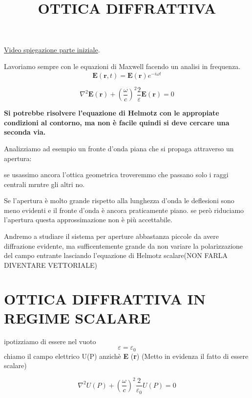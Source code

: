 \documentclass{article}
\begin{document}
\title{OTTICA DIFFRATTIVA}


\href{https://www.youtube.com/watch?v=8Ep_aPSrwYI}{Video spiegazione parte iniziale}.  %


Lavoriamo sempre con le equazioni di Maxwell facendo un analisi in frequenza.
\begin{equation}
\textbf{E}(\textbf{r}, t)= \textbf{E}( \textbf{r} ) e^{-i \omega t}
\end{equation}

\begin{equation}
\nabla ^{2}\textbf{E} (\textbf{r}) + (\frac{\omega}{c})^{2}\frac{2}{\varepsilon}\textbf{E} (\textbf{r})=0
\end{equation}

\textbf{Si potrebbe risolvere l'equazione di Helmotz con le appropiate condizioni al contorno, ma non è facile quindi si deve cercare una seconda via.}

Analizziamo ad esempio un fronte d'onda piana che si propaga attraverso un apertura:

 se usassimo ancora l'ottica geometrica troveremmo che passano solo i raggi centrali mrntre gli altri no.


Se l'apertura è molto grande rispetto alla lunghezza d'onda le deflesioni sono meno evidenti e il fronte d'onda è ancora praticamente piano. se però riduciamo l'apertura questa approssimazione non è più accettabile.

Andremo a studiare il sistema per aperture abbastanza piccole da avere diffrazione evidente, ma sufficentemente grande da non variare la polarizzazione del campo entrante lasciando l'equazione di Helmotz scalare(NON FARLA DIVENTARE VETTORIALE)

\section{OTTICA DIFFRATTIVA IN REGIME SCALARE}

ipotizziamo di essere nel vuoto 
\begin{equation}
\varepsilon = \varepsilon 	_{0}
\end{equation}
chiamo il campo elettrico U(P) anzichè \textbf{E} (\textbf{r}) 		(Metto in evidenza il fatto di essere scalare)

\begin{equation}
\nabla ^{2}U(P) + (\frac{\omega}{c})^{2}\frac{2}{\varepsilon _{0}}U(P)=0
\end{equation}
\end{document}
